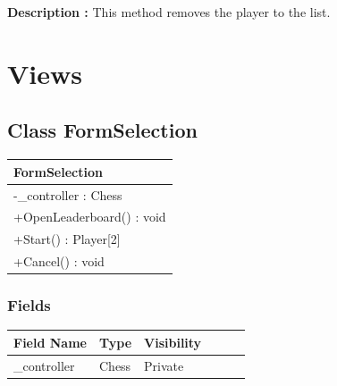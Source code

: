 \documentclass[12pt]{article}
\begin{document}
\textbf{Description :} This method removes the player to the list.

\newpage


\section{Views}


\subsection{Class FormSelection}

\begin{table}[H]
    \begin{tabular}{|l|}
    \hline
    \rowcolor[HTML]{C0C0C0} 
    \textbf{FormSelection}    \\ \hline
    \rowcolor[HTML]{EFEFEF} 
    -\_controller : Chess      \\ \hline
    \rowcolor[HTML]{FFFFFF} 
    +OpenLeaderboard() : void \\ \hline
    \rowcolor[HTML]{FFFFFF} 
    +Start() : Player{[}2{]}  \\ \hline
    \rowcolor[HTML]{FFFFFF} 
    +Cancel() : void          \\ \hline
    \end{tabular}
\end{table}

\subsubsection{Fields}

\begin{table}[H]
    \begin{tabular}{llllll}
    \hline
    \multicolumn{1}{|l|}{\cellcolor[HTML]{EFEFEF}\textbf{Field Name}} & \multicolumn{1}{l|}{\cellcolor[HTML]{EFEFEF}\textbf{Type}} & \multicolumn{1}{l|}{\cellcolor[HTML]{EFEFEF}\textbf{Visibility}} \\ \hline
    \multicolumn{1}{|l|}{\_controller}                                & \multicolumn{1}{l|}{Chess}                                & \multicolumn{1}{l|}{Private}                                     \\ \hline
    \end{tabular}
\end{table}
\end{document}
